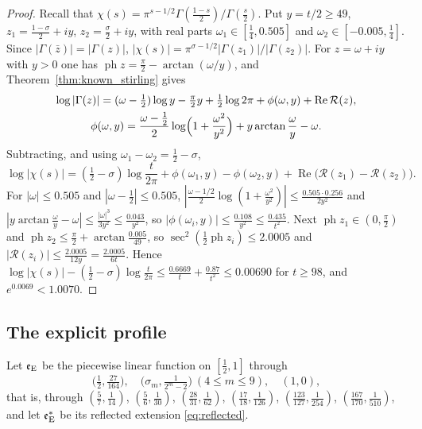 \documentclass[11pt,a4paper]{article}
\makeatletter
\numberwithin{equation}{section}
\DeclareRobustCommand{\CGref}[1]{\ref{#1}}
\DeclareRobustCommand{\CGeqref}[1]{\eqref{#1}}
\let\CG@origref\ref
\let\CG@origeqref\eqref
\newcommand{\CG@gettip}[1]{\@ifundefined{CGTip@#1}{#1}{\csname CGTip@#1\endcsname}}
\DeclareRobustCommand{\CGref}[1]{\pdftooltip{\CG@origref{#1}}{\CG@gettip{#1}}}
\DeclareRobustCommand{\CGeqref}[1]{\pdftooltip{\CG@origeqref{#1}}{\CG@gettip{#1}}}
\theoremstyle{definition}
\theoremstyle{remark}
\newcommand{\eE}{\mathfrak e_{\rm E}}
\makeatother
\begin{document}
\begin{proof}
Recall that $\chi(s)=\pi^{s-1/2}\Gamma(\frac{1-s}2)/\Gamma(\frac s2)$. Put $y=t/2\ge49$, $z_1=\frac{1-\sigma}2+iy$, $z_2=\frac\sigma2+iy$, with real parts $\omega_1\in[\frac14,0.505]$ and $\omega_2\in[-0.005,\frac14]$. Since $|\Gamma(\bar z)|=|\Gamma(z)|$, $|\chi(s)|=\pi^{\sigma-1/2}|\Gamma(z_1)|/|\Gamma(z_2)|$. For $z=\omega+iy$ with $y>0$ one has $\operatorname{ph}z=\frac\pi2-\arctan(\omega/y)$, and Theorem~\CGref{thm:known_stirling} gives
\begin{equation}
\begin{gathered}
\log|\Gamma(z)|=(\omega-\tfrac12)\log y-\tfrac\pi2y+\tfrac12\log2\pi+\phi(\omega,y)+\operatorname{Re}\mathcal R(z),\\
\phi(\omega,y)=\frac{\omega-\frac12}2\log\Bigl(1+\frac{\omega^2}{y^2}\Bigr)+y\arctan\frac\omega y-\omega .
\end{gathered}
\label{eq:stirling_modulus}
\end{equation}
Subtracting, and using $\omega_1-\omega_2=\frac12-\sigma$,
\begin{equation}
\log|\chi(s)|=(\tfrac12-\sigma)\log\frac t{2\pi}+\phi(\omega_1,y)-\phi(\omega_2,y)+\operatorname{Re}\bigl(\mathcal R(z_1)-\mathcal R(z_2)\bigr).
\label{eq:disp_11}
\end{equation}
For $|\omega|\le0.505$ and $|\omega-\frac12|\le0.505$, $|\frac{\omega-1/2}2\log(1+\frac{\omega^2}{y^2})|\le\frac{0.505\cdot0.256}{2y^2}$ and $|y\arctan\frac\omega y-\omega|\le\frac{|\omega|^3}{3y^2}\le\frac{0.043}{y^2}$, so $|\phi(\omega_i,y)|\le\frac{0.108}{y^2}\le\frac{0.435}{t^2}$. Next $\operatorname{ph}z_1\in(0,\frac\pi2)$ and $\operatorname{ph}z_2\le\frac\pi2+\arctan\frac{0.005}{49}$, so $\sec^2(\frac12\operatorname{ph}z_i)\le2.0005$ and $|\mathcal R(z_i)|\le\frac{2.0005}{12y}=\frac{2.0005}{6t}$. Hence $\log|\chi(s)|-(\frac12-\sigma)\log\frac t{2\pi}\le\frac{0.6669}t+\frac{0.87}{t^2}\le0.00690$ for $t\ge98$, and $e^{0.0069}<1.0070$.
\end{proof}

\subsection{The explicit profile}\label{subsec:explicit_profile}
Let $\eE$ be the piecewise linear function on $[\frac12,1]$ through
\begin{equation}
\bigl(\tfrac12,\tfrac{27}{164}\bigr),\quad\bigl(\sigma_m,\tfrac1{2^m-2}\bigr)\ (4\le m\le9),\quad(1,0),
\label{eq:explicit_nodes}
\end{equation}
that is, through $(\frac57,\frac1{14})$, $(\frac56,\frac1{30})$, $(\frac{28}{31},\frac1{62})$, $(\frac{17}{18},\frac1{126})$, $(\frac{123}{127},\frac1{254})$, $(\frac{167}{170},\frac1{510})$, and let $\eE^*$ be its reflected extension \CGeqref{eq:reflected}.
\end{document}
